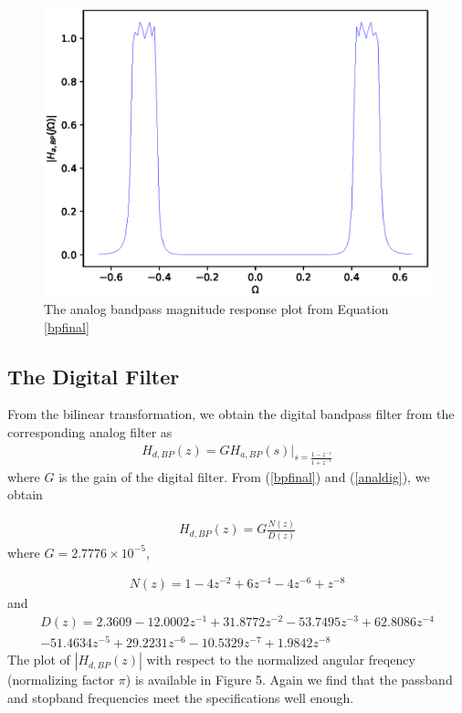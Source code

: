 \documentclass{article}
\begin{document}
\begin{figure}
\label{fig4}
\includegraphics[width = 15cm]{./figs/iir-bandpass-analog.eps}
\caption{The analog bandpass magnitude response plot from Equation \ref{bpfinal}} 
\end{figure}

\subsection{The Digital Filter}
From the bilinear transformation, we obtain the digital bandpass filter from the corresponding analog filter as
\begin{eqnarray}
\label{analdig}
H_{d,BP}(z) = GH_{a,BP}(s)\vert_{s = \frac{1-z^{-1}}{1 + z^{-1}}}
\end{eqnarray}
where $G$ is the gain of the digital filter.  From (\ref{bpfinal}) and (\ref{analdig}), we obtain

\begin{eqnarray}
H_{d,BP}(z) = G \frac{N(z)}{D(z)}
\end{eqnarray}
where $G = 2.7776 \times 10^{-5}$,

\begin{eqnarray}
N(z)=  1 - 4 z^{-2} + 6 z^{-4} - 4z^{-6} + z^{-8} 
\end{eqnarray}
and
\begin{eqnarray}
D(z) = 2.3609  -12.0002z^{-1} + 31.8772z^{-2}  -53.7495z^{-3}+  62.8086z^{-4}\nonumber \\
  -51.4634z^{-5}+   29.2231z^{-6}  -10.5329z^{-7} +   1.9842z^{-8}
\end{eqnarray}
The plot of $|H_{d,BP}(z)|$ with respect to the normalized angular freqency (normalizing factor $\pi$) is available in Figure 5.  Again we
find that the passband and stopband frequencies meet the specifications well enough.
\end{document}
